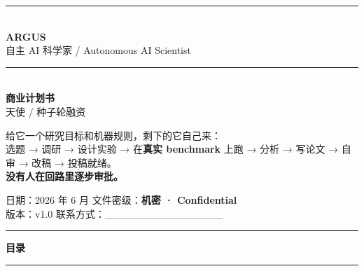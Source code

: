 \documentclass[UTF8,11pt,fontset=none]{ctexart}
\begin{document}
\sffamily

\begin{titlepage}
\thispagestyle{empty}
\vspace*{1.2cm}
\begin{flushleft}
{\color{argusline}\rule{\textwidth}{2pt}}\\[1.0cm]
{\sffamily\fontsize{56}{60}\selectfont\bfseries\color{argusnavy} ARGUS}\\[0.3cm]
{\sffamily\Large\color{argusteal} 自主 AI 科学家 \;/\; Autonomous AI Scientist}\\[0.8cm]
{\color{argusline}\rule{\textwidth}{1pt}}\\[1.2cm]

{\sffamily\huge\bfseries\color{argusnavy} 商业计划书}\\[0.5cm]
{\sffamily\Large\color{argusgray} 天使 / 种子轮融资}\\[2.0cm]

\begin{quotebox}
{\large 给它一个研究目标和机器规则，剩下的它自己来：\\
选题 → 调研 → 设计实验 → 在\textbf{真实 benchmark} 上跑 → 分析 → 写论文 → 自审 → 改稿 → 投稿就绪。\\[4pt]
\textbf{没有人在回路里逐步审批。}}
\end{quotebox}

\vfill
{\sffamily\color{argusgray}
日期：2026 年 6 月 \hfill 文件密级：\textbf{机密 · Confidential}\\
版本：v1.0 \hfill 联系方式：\_\_\_\_\_\_\_\_\_\_\_\_\_\_\_\_}\\[0.4cm]
{\color{argusline}\rule{\textwidth}{2pt}}
\end{flushleft}
\end{titlepage}

\thispagestyle{empty}
{\sffamily\color{argusnavy}\Large\bfseries 目录}\\[0.3em]
{\color{argusline}\rule{\textwidth}{1pt}}
\vspace{0.4em}
\setcounter{tocdepth}{1}
\tableofcontents
\clearpage

\end{document}
